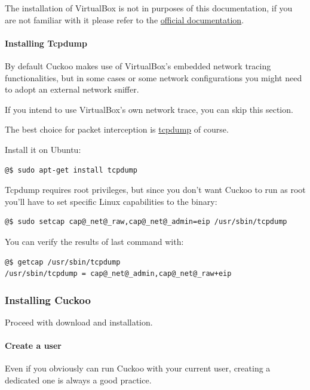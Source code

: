 \documentclass[letterpaper,10pt,english]{sphinxmanual}
\begin{document}
The installation of VirtualBox is not in purposes of this documentation, if you
are not familiar with it please refer to the \href{https://www.virtualbox.org/wiki/Documentation}{official documentation}.


\paragraph{Installing Tcpdump}
\label{installation/host/requirements:installing-tcpdump}\label{installation/host/requirements:official-documentation}
By default Cuckoo makes use of VirtualBox's embedded network tracing
functionalities, but in some cases or some network configurations you might need
to adopt an external network sniffer.

If you intend to use VirtualBox's own network trace, you can skip this section.

The best choice for packet interception is \href{http://www.tcpdump.org}{tcpdump} of course.

Install it on Ubuntu:

\begin{Verbatim}[commandchars=@\[\]]
@$ sudo apt-get install tcpdump
\end{Verbatim}

Tcpdump requires root privileges, but since you don't want Cuckoo to run as root
you'll have to set specific Linux capabilities to the binary:

\begin{Verbatim}[commandchars=@\[\]]
@$ sudo setcap cap@_net@_raw,cap@_net@_admin=eip /usr/sbin/tcpdump
\end{Verbatim}

You can verify the results of last command with:

\begin{Verbatim}[commandchars=@\[\]]
@$ getcap /usr/sbin/tcpdump
/usr/sbin/tcpdump = cap@_net@_admin,cap@_net@_raw+eip
\end{Verbatim}


\subsubsection{Installing Cuckoo}
\label{installation/host/installation::doc}\label{installation/host/installation:tcpdump}\label{installation/host/installation:installing-cuckoo}
Proceed with download and installation.


\paragraph{Create a user}
\label{installation/host/installation:create-a-user}
Even if you obviously can run Cuckoo with your current user, creating a dedicated
one is always a good practice.
\end{document}
